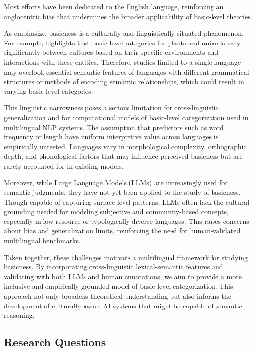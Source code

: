 \documentclass[preprint,12pt,authoryear]{elsarticle}
\begin{document}
Most efforts have been dedicated to the English language, reinforcing an anglocentric bias that undermines the broader applicability of basic-level theories.

As \citet{bolognesi_abstraction_2020} emphasize, basicness is a culturally and linguistically situated phenomenon. For example, \citet{murphy_explaining_2016} highlights that basic-level categories for plants and animals vary significantly between cultures based on their specific environments and interactions with these entities. Therefore, studies limited to a single language may overlook essential semantic features of languages with different grammatical structures or methods of encoding semantic relationships, which could result in varying basic-level categories.

This linguistic narrowness poses a serious limitation for cross-linguistic generalization and for computational models of basic-level categorization used in multilingual NLP systems. The assumption that predictors such as word frequency or length have uniform interpretive value across languages is empirically untested. Languages vary in morphological complexity, orthographic depth, and phonological factors that may influence perceived basicness but are rarely accounted for in existing models.

Moreover, while Large Language Models (LLMs) are increasingly used for semantic judgments, they have not yet been applied to the study of basicness. Though capable of capturing surface-level patterns, LLMs often lack the cultural grounding needed for modeling subjective and community-based concepts, especially in low-resource or typologically diverse languages. This raises concerns about bias and generalization limits, reinforcing the need for human-validated multilingual benchmarks.

Taken together, these challenges motivate a multilingual framework for studying basicness. By incorporating cross-linguistic lexical-semantic features and validating with both LLMs and human annotations, we aim to provide a more inclusive and empirically grounded model of basic-level categorization. This approach not only broadens theoretical understanding but also informs the development of culturally-aware AI systems that might be capable of semantic reasoning.

\subsection{Research Questions}
\end{document}
